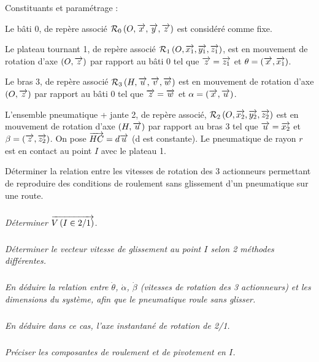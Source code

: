 \documentclass[10pt]{article}
\begin{document}
Constituants et paramétrage : 
 
Le bâti 0, de repère associé $\mathcal{R}_0\left( O,\overrightarrow{x},\overrightarrow{y},\overrightarrow{z}\right)$ 
est considéré comme fixe. 

Le plateau tournant 1, de repère associé $\mathcal{R}_1\left( O,\overrightarrow{x_1},\overrightarrow{y_1},\overrightarrow{z_1}\right)$, est en mouvement de rotation d’axe $\left(O,\overrightarrow{z}\right)$ 
par rapport au bâti 0 tel que $\overrightarrow{z}=\overrightarrow{z_1}$ et $\theta=\left(\overrightarrow{x},\overrightarrow{x_1}\right)$. 

Le bras 3, de repère associé $\mathcal{R}_3\left( H,\overrightarrow{u},\overrightarrow{v},\overrightarrow{w}\right)$
 est en mouvement de rotation d’axe $\left(O,\overrightarrow{z}\right)$ par rapport au 
bâti 0 tel que $\overrightarrow{z}=\overrightarrow{w}$ et $\alpha = \left(\overrightarrow{x},\overrightarrow{u}\right)$.

L’ensemble pneumatique + jante 2, de repère associé, $\mathcal{R}_2\left( O,\overrightarrow{x_2},\overrightarrow{y_2},\overrightarrow{z_2}\right)$ est en mouvement de rotation 
d’axe $\left(H,\overrightarrow{u}\right)$ par rapport au bras 3 tel que $\overrightarrow{u}=\overrightarrow{x_2}$ et $\beta = \left(\overrightarrow{z},\overrightarrow{z_2}\right)$. On pose $\overrightarrow{HC}=d\overrightarrow{u}$ (d est constante). Le pneumatique de rayon $r$ est en contact au point $I$ avec le plateau 1. 

\begin{Objectif}
Déterminer la relation entre les vitesses de rotation des 3 actionneurs permettant de reproduire 
des conditions de roulement sans glissement d’un pneumatique sur une route. 
\end{Objectif}

\subparagraph{}
\textit{Déterminer $\overrightarrow{V\left( {I} \in {2}/{1}\right)}$.}

\subparagraph{}
\textit{Déterminer le vecteur vitesse de glissement au point $I$ selon 2 méthodes différentes.}

\subparagraph{}
\textit{En déduire la relation entre $\dot{\theta}$, $\dot{\alpha}$, $\dot{\beta}$ (vitesses de rotation des 3 actionneurs) et les dimensions du système, afin que le pneumatique roule sans glisser.}

\subparagraph{}
\textit{En déduire dans ce cas, l’axe instantané de rotation de 2/1.}

\subparagraph{}
\textit{Préciser les composantes de roulement et de pivotement en $I$.}
\end{document}

